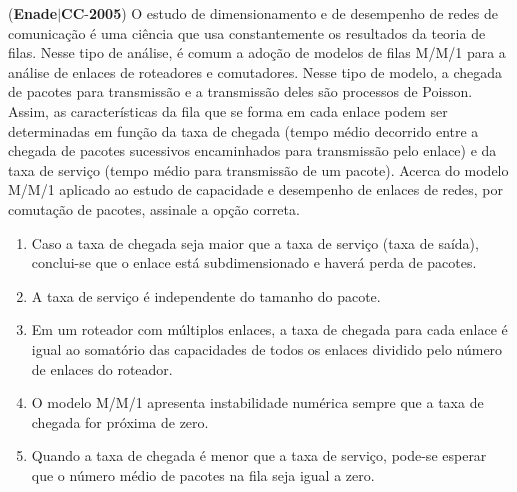 \documentclass{exam}
\begin{document}
\begin{questions}
\question (\textbf{Enade}$|$\textbf{CC}-\textbf{2005}) O estudo de dimensionamento e de desempenho de redes de
comunicação é uma ciência que usa constantemente os resultados da
teoria de filas. Nesse tipo de análise, é comum a adoção de modelos
de filas M/M/1 para a análise de enlaces de roteadores e
comutadores. Nesse tipo de modelo, a chegada de pacotes para
transmissão e a transmissão deles são processos de Poisson. Assim,
as características da fila que se forma em cada enlace podem ser
determinadas em função da taxa de chegada (tempo médio decorrido
entre a chegada de pacotes sucessivos encaminhados para
transmissão pelo enlace) e da taxa de serviço (tempo médio para
transmissão de um pacote). Acerca do modelo M/M/1 aplicado ao
estudo de capacidade e desempenho de enlaces de redes, por
comutação de pacotes, assinale a opção correta.
	\begin{enumerate}[label=\alph*)]
		\item  Caso a taxa de chegada seja maior que a taxa de serviço (taxa de
saída), conclui-se que o enlace está subdimensionado e haverá
perda de pacotes.
		\item  A taxa de serviço é independente do tamanho do pacote.
		\item  Em um roteador com múltiplos enlaces, a taxa de chegada para
cada enlace é igual ao somatório das capacidades de todos os
enlaces dividido pelo número de enlaces do roteador.
		\item  O modelo M/M/1 apresenta instabilidade numérica sempre que
a taxa de chegada for próxima de zero.
		\item  Quando a taxa de chegada é menor que a taxa de serviço,
pode-se esperar que o número médio de pacotes na fila seja igual
a zero.

	\end{enumerate}


\end{questions}
\end{document}
